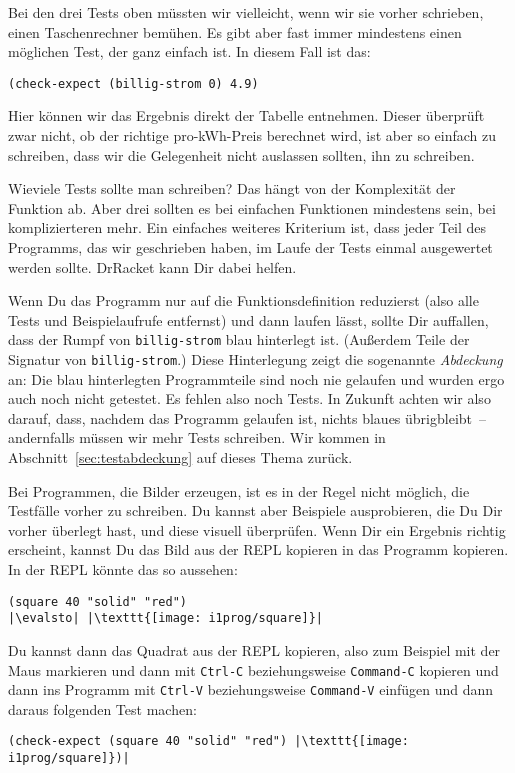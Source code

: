 Bei den drei Tests oben müssten wir vielleicht, wenn wir sie vorher
schrieben, einen Taschenrechner bemühen.  Es gibt aber fast immer
mindestens einen möglichen Test, der ganz einfach ist.  In diesem Fall
ist das:
%
\begin{lstlisting}
(check-expect (billig-strom 0) 4.9)
\end{lstlisting}
%
Hier können wir das Ergebnis direkt der Tabelle entnehmen.  Dieser
überprüft zwar nicht, ob der richtige pro-kWh-Preis berechnet wird,
ist aber so einfach zu schreiben, dass wir die Gelegenheit nicht
auslassen sollten, ihn zu schreiben.

Wieviele Tests sollte man schreiben?  Das hängt von der Komplexität
der Funktion ab.  Aber drei sollten es bei einfachen Funktionen
mindestens sein, bei komplizierteren mehr.  Ein einfaches weiteres
Kriterium ist, dass jeder Teil des Programms, das wir geschrieben
haben, im Laufe der Tests einmal ausgewertet werden sollte.  DrRacket
kann Dir dabei helfen.

\label{page:abdeckung0}
Wenn Du das Programm nur auf die Funktionsdefinition reduzierst (also
alle Tests und Beispiel\-aufrufe entfernst) und dann laufen lässt,
sollte Dir auffallen, dass der Rumpf von \lstinline{billig-strom} blau
hinterlegt ist.  (Außerdem Teile der Signatur von
\lstinline{billig-strom}.)  Diese Hinterlegung zeigt die sogenannte
\textit{Abdeckung} an: Die blau hinterlegten
Programmteile sind noch nie gelaufen und wurden ergo auch noch nicht
getestet.  Es fehlen also noch Tests.  In Zukunft achten wir also
darauf, dass, nachdem das Programm gelaufen ist, nichts blaues
übrigbleibt~-- andernfalls müssen wir mehr Tests schreiben.  Wir
kommen in Abschnitt~\ref{sec:testabdeckung} auf dieses Thema zurück.

Bei Programmen, die Bilder erzeugen, ist es in der Regel nicht
möglich, die Testfälle vorher zu schreiben.  Du kannst aber Beispiele
ausprobieren, die Du Dir vorher überlegt hast, und diese visuell überprüfen.
Wenn Dir ein Ergebnis richtig erscheint, kannst Du das Bild aus der
REPL kopieren in das Programm kopieren.  In der REPL könnte das so aussehen:
%
\begin{lstlisting}
(square 40 "solid" "red")
|\evalsto| |\texttt{[image: i1prog/square]}|
\end{lstlisting}
%
Du kannst dann das Quadrat aus der REPL kopieren, also zum Beispiel
mit der Maus markieren und dann mit \texttt{Ctrl-C} beziehungsweise
\texttt{Command-C} kopieren und dann ins Programm mit \texttt{Ctrl-V}
beziehungsweise \texttt{Command-V} einfügen und dann daraus folgenden
Test machen:
%
\begin{lstlisting}
(check-expect (square 40 "solid" "red") |\texttt{[image: i1prog/square]})|
\end{lstlisting}

